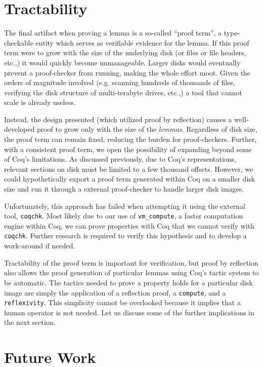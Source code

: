 \documentclass[nocopyrightspace]{sigplanconf}
\begin{document}
\section{Tractability}

The final artifact when proving a lemma is a so-called ``proof term'', a
type-checkable entity which serves as verifiable evidence for the lemma. If
this proof term were to grow with the size of the underlying disk (or files or
file headers, etc.,) it would quickly become unmanageable. Larger disks would
eventually prevent a proof-checker from running, making the whole effort moot.
Given the orders of magnitude involved (e.g. scanning hundreds of thousands of
files, verifying the disk structure of multi-terabyte drives, etc.,) a tool
that cannot scale is already useless.

Instead, the design presented (which utilized proof by reflection) causes a
well-developed proof to grow only with the size of the {\em lemmas}.
Regardless of disk size, the proof term can remain fixed, reducing the
burden for proof-checkers. Further, with a consistent proof term, we open the
possibility of expanding beyond some of Coq's limitations. As discussed
previously, due to Coq's representations, relevant sections on disk must be
limited to a few thousand offsets. However, we could hypothetically export a
proof term generated within Coq on a smaller disk size and run it through a
external proof-checker to handle larger disk images.

Unfortunately, this approach has failed when attempting it using the external
tool, {\tt coqchk}. Most likely due to our use of {\tt vm\_compute}, a faster
computation engine within Coq, we can prove properties with Coq that we cannot
verify with {\tt coqchk}. Further research is required to verify this
hypothesis and to develop a work-around if needed.

Tractability of the proof term is important for verification, but proof by
reflection also allows the proof generation of particular lemmas using Coq's
tactic system to be automatic. The tactics needed to prove a property holds
for a particular disk image are simply the application of a reflection proof,
a {\tt compute}, and a {\tt reflexivity}. This simplicity cannot be overlooked
because it implies that a human operator is not needed. Let us discuss some of
the further implications in the next section.

\section{Future Work}
\label{sec:future}
\end{document}

